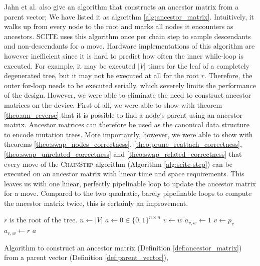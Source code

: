 Jahn et al. \cite{tree2016} also give an algorithm that constructs an ancestor matrix from a parent vector; We have listed it as algorithm \ref{alg:ancestor_matrix}. Intuitively, it walks up from every node to the root and marks all nodes it encounters as ancestors. \ac{SCITE} uses this algorithm once per chain step to sample descendants and non-descendants for a move. Hardware implementations of this algorithm are however inefficient since it is hard to predict how often the inner while-loop is executed. For example, it may be executed $|V|$ times for the leaf of a completely degenerated tree, but it may not be executed at all for the root $r$. Therefore, the outer for-loop needs to be executed serially, which severely limits the performance of the design. However, we were able to eliminate the need to construct ancestor matrices on the device. First of all, we were able to show with theorem \ref{theo:am_reverse} that it is possible to find a node's parent using an ancestor matrix. Ancestor matrices can therefore be used as the canonical data structure to encode mutation trees. More importantly, however, we were able to show with theorems \ref{theo:swap_nodes_correctness}, \ref{theo:prune_reattach_correctness}, \ref{theo:swap_unrelated_correctness} and \ref{theo:swap_related_correctness} that every move of the \textsc{ChainStep} algorithm (Algorithm \ref{alg:scite-step}) can be executed on an ancestor matrix with linear time and space requirements. This leaves us with one linear, perfectly pipelinable loop to update the ancestor matrix for a move. Compared to the two quadratic, barely pipelinable loops to compute the ancestor matrix twice, this is certainly an improvement.

\begin{algorithm}
    \begin{algorithmic}[1]
         \Comment $r$ is the root of the tree.
            \State $n \leftarrow |V|$
            \State $a \leftarrow 0 \in \{0,1\}^{n \times n}$
                \State $v \leftarrow w$
                    \State $a_{v, w} \leftarrow 1$
                    \State $v \leftarrow p_v$
                \EndWhile
                \State $a_{r, w} \leftarrow r$
            \EndFor
            \State \Return $a$
        \EndFunction
    \end{algorithmic}
    \caption{Algorithm to construct an ancestor matrix (Definition \ref{def:ancestor_matrix}) from a parent vector (Definition \ref{def:parent_vector}), \cite{tree2016}}
    \label{alg:ancestor_matrix}
\end{algorithm}

